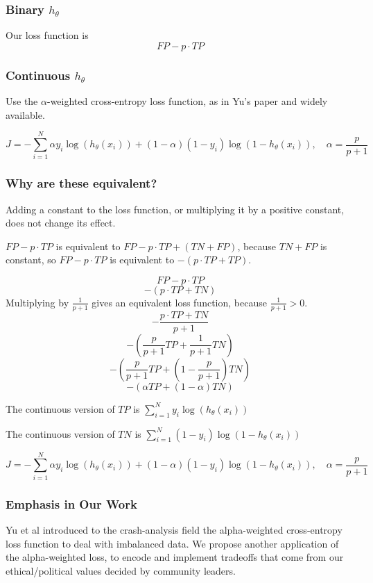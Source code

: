 \subsubsection{Binary $h_\theta$}

Our loss function is $$FP - p\cdot TP $$

\subsubsection{Continuous $h_\theta$}

Use the $\alpha$-weighted cross-entropy loss function, as in Yu's paper and widely available.

$$J = -\sum_{i=1}^N \alpha y_i \log( h_\theta (x_i)) + (1-\alpha)(1-y_i) \log( 1 - h_\theta (x_i)), \quad \alpha = \frac{p}{p+1}$$

\subsubsection{Why are these equivalent?}

Adding a constant to the loss function, or multiplying it by a positive constant, does not change its effect.  

$FP - p \cdot TP$ is equivalent to $FP - p \cdot TP + (TN+FP)$, because $TN+FP$ is constant, so 
$FP - p \cdot TP$ is equivalent to $-(p \cdot TP+ TP)$.


$$FP - p \cdot TP$$
$$-(p \cdot TP + TN)$$
Multiplying by $\frac{1}{p+1}$ gives an equivalent loss function, because $\frac{1}{p+1}>0$.
$$-\frac{p \cdot TP + TN}{p+1}$$
$$- \left( \frac{p}{p+1} TP + \frac{1}{p+1} TN\right)$$
$$- \left( \frac{p}{p+1} TP + \left( 1 - \frac{p}{p+1} \right) TN \right)$$
$$- (\alpha TP + (1 - \alpha) TN) $$

The continuous version of $TP$ is 
$ \displaystyle \sum_{i=1}^N y_i \log( h_\theta (x_i))$

The continuous version of $TN$ is 
$ \displaystyle \sum_{i=1}^N (1-y_i) \log( 1 - h_\theta (x_i))$

$$J = -\sum_{i=1}^N \alpha y_i \log( h_\theta (x_i)) + (1-\alpha)(1-y_i) \log( 1 - h_\theta (x_i)), \quad \alpha = \frac{p}{p+1}$$

\subsubsection{Emphasis in Our Work}

Yu et al introduced to the crash-analysis field the alpha-weighted cross-entropy loss function to deal with imbalanced data.  We propose another application of the alpha-weighted loss, to encode and implement tradeoffs that come from our ethical/political values decided by community leaders.   

